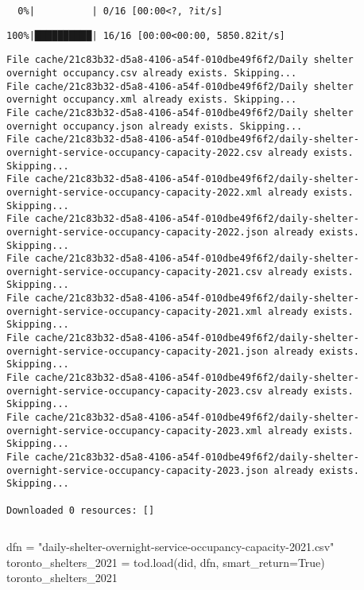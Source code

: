 \documentclass[
  letterpaper,
  DIV=11,
  numbers=noendperiod]{scrreprt}
\newenvironment{Shaded}{\begin{snugshade}}{\end{snugshade}}
\newcommand{\NormalTok}[1]{\textcolor[rgb]{0.00,0.23,0.31}{#1}}
\newcommand{\OperatorTok}[1]{\textcolor[rgb]{0.37,0.37,0.37}{#1}}
\newcommand{\StringTok}[1]{\textcolor[rgb]{0.13,0.47,0.30}{#1}}
\newcommand{\VariableTok}[1]{\textcolor[rgb]{0.07,0.07,0.07}{#1}}
\begin{document}
\begin{verbatim}
  0%|          | 0/16 [00:00<?, ?it/s]
\end{verbatim}

\begin{verbatim}
100%|██████████| 16/16 [00:00<00:00, 5850.82it/s]
\end{verbatim}

\begin{verbatim}
File cache/21c83b32-d5a8-4106-a54f-010dbe49f6f2/Daily shelter overnight occupancy.csv already exists. Skipping...
File cache/21c83b32-d5a8-4106-a54f-010dbe49f6f2/Daily shelter overnight occupancy.xml already exists. Skipping...
File cache/21c83b32-d5a8-4106-a54f-010dbe49f6f2/Daily shelter overnight occupancy.json already exists. Skipping...
File cache/21c83b32-d5a8-4106-a54f-010dbe49f6f2/daily-shelter-overnight-service-occupancy-capacity-2022.csv already exists. Skipping...
File cache/21c83b32-d5a8-4106-a54f-010dbe49f6f2/daily-shelter-overnight-service-occupancy-capacity-2022.xml already exists. Skipping...
File cache/21c83b32-d5a8-4106-a54f-010dbe49f6f2/daily-shelter-overnight-service-occupancy-capacity-2022.json already exists. Skipping...
File cache/21c83b32-d5a8-4106-a54f-010dbe49f6f2/daily-shelter-overnight-service-occupancy-capacity-2021.csv already exists. Skipping...
File cache/21c83b32-d5a8-4106-a54f-010dbe49f6f2/daily-shelter-overnight-service-occupancy-capacity-2021.xml already exists. Skipping...
File cache/21c83b32-d5a8-4106-a54f-010dbe49f6f2/daily-shelter-overnight-service-occupancy-capacity-2021.json already exists. Skipping...
File cache/21c83b32-d5a8-4106-a54f-010dbe49f6f2/daily-shelter-overnight-service-occupancy-capacity-2023.csv already exists. Skipping...
File cache/21c83b32-d5a8-4106-a54f-010dbe49f6f2/daily-shelter-overnight-service-occupancy-capacity-2023.xml already exists. Skipping...
File cache/21c83b32-d5a8-4106-a54f-010dbe49f6f2/daily-shelter-overnight-service-occupancy-capacity-2023.json already exists. Skipping...

Downloaded 0 resources: []
\end{verbatim}

\begin{verbatim}
\end{verbatim}

\begin{Shaded}
\begin{Highlighting}[]
\NormalTok{dfn }\OperatorTok{=} \StringTok{"daily{-}shelter{-}overnight{-}service{-}occupancy{-}capacity{-}2021.csv"}
\NormalTok{toronto\_shelters\_2021 }\OperatorTok{=}\NormalTok{ tod.load(did, dfn, smart\_return}\OperatorTok{=}\VariableTok{True}\NormalTok{)}
\NormalTok{toronto\_shelters\_2021}
\end{Highlighting}
\end{Shaded}
\end{document}
